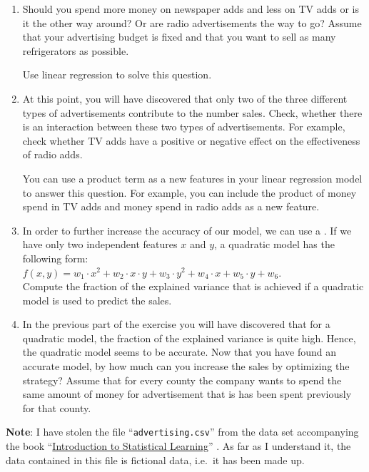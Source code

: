 \begin{enumerate}
\item Should you spend more money on newspaper adds and less on TV adds or is it the other way around?  Or are radio
      advertisements the way to go? Assume that your advertising budget is fixed and that you want to sell as many
      refrigerators as possible.  

      Use linear regression to solve this question.
\item At this point, you will have discovered that only two of the three different types of advertisements 
      contribute to the number sales.  Check, whether there is an interaction between these two types of
      advertisements.  For example, check whether TV adds have a positive or negative effect on the
      effectiveness of radio adds. 

      You can use a product term as a new features in your linear regression model to answer this question.
      For example, you can include the product of money spend in TV adds and money spend in radio adds as a new
      feature.
\item In order to further increase the accuracy of our model, we can use a .
      If we have only two independent features $x$ and $y$, a quadratic model has the following form:
      \\[0.2cm]
      \hspace*{1.3cm}
      $f(x,y) = w_1 \cdot x^2 + w_2 \cdot x \cdot y + w_3 \cdot y^2 + w_4 \cdot x + w_5 \cdot y + w_6$.
      \\[0.2cm]
      Compute the fraction of the explained variance that is achieved if a quadratic model is used to predict
      the sales.
\item In the previous part of the exercise you will have discovered that for a quadratic model, the fraction of
      the explained variance is quite high.  Hence, the quadratic model seems to be accurate.  Now that you
      have found an accurate model, by how much can you increase the sales by optimizing the strategy?
      Assume that for every county the company wants to spend the same amount of money for advertisement that
      is has been spent previously for that county.  
\end{enumerate}
\vspace*{0.2cm}

\noindent
\textbf{Note}:  I have stolen the file ``\texttt{advertising.csv}'' from the data set accompanying the book
``\href{http://www-bcf.usc.edu/~gareth/ISL/index.html}{Introduction to Statistical Learning}''
\cite{james:2014}.  As far as I understand it, the data contained in this file is fictional data, i.e.~it
has been made up. 
\eox

